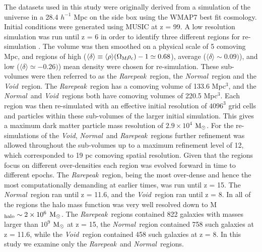 \documentclass[graphics, twocolumn, usenatbib]{mn2e}
\newcommand{\mpch} {\rm $h^{-1}$ Mpc\,\,}
\newcommand{\msolar} {$\rm{M_{\odot}}~$}
\newcommand{\msolarc} {$\rm{M_{\odot}}$}
\newcommand{\rarepeak} {\textit{Rarepeak~}}
\newcommand{\normal} {\textit{Normal~}}
\newcommand{\void} {\textit{Void~}}
\newcommand{\voidc} {\textit{Void}}
\begin{document}
The datasets used in this study were originally derived from a simulation of the universe in a 28.4
\mpch on the side box using the WMAP7 best fit cosmology. Initial conditions were generated using
MUSIC \citep{Hahn_2011} at z = 99. A low resolution simulation was run until z = 6 in order to
identify three different regions for re-simulation \citep{Chen_2014}. The volume was then smoothed
on a physical scale of 5 comoving Mpc, and regions of high
($\langle\delta\rangle \equiv \langle\rho\rangle(\Omega_{\rm M} \rho_{\rm c}) - 1 \simeq 0.68$),
average ($\langle\delta\rangle \sim 0.09)$), and low ($\langle\delta\rangle \simeq -0.26)$)
mean density were chosen for re-simulation. These sub-volumes were then referred to as the
\rarepeak region, the \normal region  and the \void region. The \rarepeak region has a comoving
volume of 133.6 Mpc$^3$, and the \normal and \void regions both have comoving volumes of 220.5
Mpc$^3$. Each region was then re-simulated with an effective initial resolution of $4096^3$ grid
cells and particles within these sub-volumes of the larger initial simulation. This gives a maximum
dark matter particle mass resolution of $2.9 \times 10^4$ \msolarc. For the re-simulations of the
\voidc, \normal and \rarepeak regions further refinement was allowed throughout the sub-volumes up
to a maximum refinement level of 12, which corresponded to 19 pc comoving spatial resolution. Given
that the regions focus on different over-densities each region was evolved forward in time to
different epochs. The \rarepeak region, being the most over-dense and hence the most
computationally demanding at earlier times, was run until z = 15. The \normal region ran until z =
11.6, and the \void region ran until z = 8. In all of the regions the halo mass function was very
well resolved down to M$_{\rm halo} \sim 2 \times 10^6$ \msolarc. The \rarepeak regions contained
822 galaxies with masses larger than $10^9$ \msolar at z = 15, the \normal region contained 758
such galaxies at z = 11.6, while the \void region contained 458 such galaxies at z = 8.
In this study we examine only the \rarepeak and \normal regions.
\end{document}
